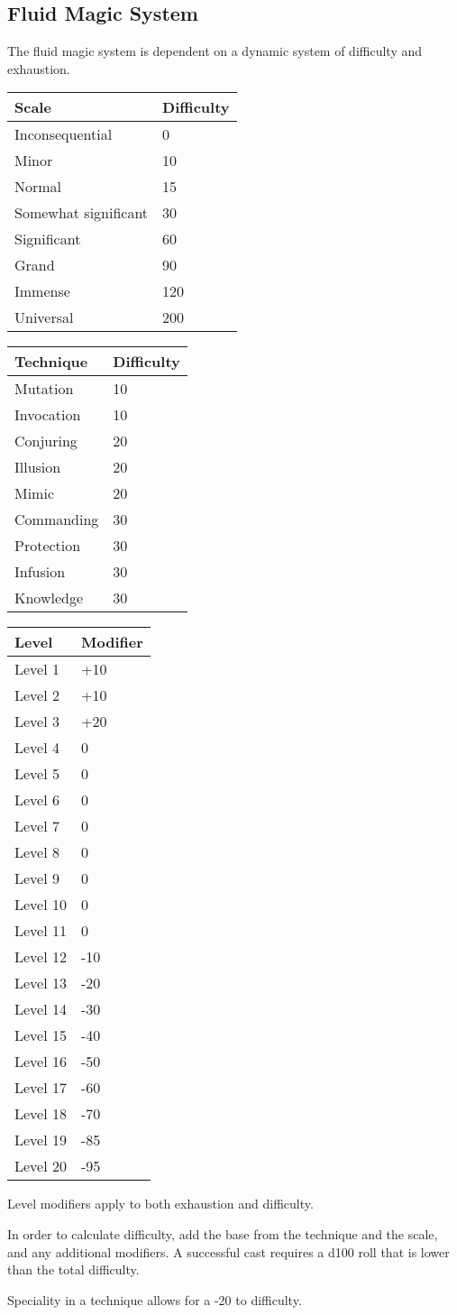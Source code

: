 \documentclass[]{article}
\begin{document}
\subsection{Fluid Magic System}\label{fluid-magic-system}

The fluid magic system is dependent on a dynamic system of difficulty
and exhaustion.

\begin{longtable}[]{@{}ll@{}}
\toprule
Scale & Difficulty\tabularnewline
\midrule
\endhead
Inconsequential & 0\tabularnewline
Minor & 10\tabularnewline
Normal & 15\tabularnewline
Somewhat significant & 30\tabularnewline
Significant & 60\tabularnewline
Grand & 90\tabularnewline
Immense & 120\tabularnewline
Universal & 200\tabularnewline
\bottomrule
\end{longtable}

\begin{longtable}[]{@{}ll@{}}
\toprule
Technique & Difficulty\tabularnewline
\midrule
\endhead
Mutation & 10\tabularnewline
Invocation & 10\tabularnewline
Conjuring & 20\tabularnewline
Illusion & 20\tabularnewline
Mimic & 20\tabularnewline
Commanding & 30\tabularnewline
Protection & 30\tabularnewline
Infusion & 30\tabularnewline
Knowledge & 30\tabularnewline
\bottomrule
\end{longtable}

\begin{longtable}[]{@{}ll@{}}
\toprule
Level & Modifier\tabularnewline
\midrule
\endhead
Level 1 & +10\tabularnewline
Level 2 & +10\tabularnewline
Level 3 & +20\tabularnewline
Level 4 & 0\tabularnewline
Level 5 & 0\tabularnewline
Level 6 & 0\tabularnewline
Level 7 & 0\tabularnewline
Level 8 & 0\tabularnewline
Level 9 & 0\tabularnewline
Level 10 & 0\tabularnewline
Level 11 & 0\tabularnewline
Level 12 & -10\tabularnewline
Level 13 & -20\tabularnewline
Level 14 & -30\tabularnewline
Level 15 & -40\tabularnewline
Level 16 & -50\tabularnewline
Level 17 & -60\tabularnewline
Level 18 & -70\tabularnewline
Level 19 & -85\tabularnewline
Level 20 & -95\tabularnewline
\bottomrule
\end{longtable}

Level modifiers apply to both exhaustion and difficulty.

In order to calculate difficulty, add the base from the technique and
the scale, and any additional modifiers. A successful cast requires a
d100 roll that is lower than the total difficulty.

Speciality in a technique allows for a -20 to difficulty.
\end{document}
